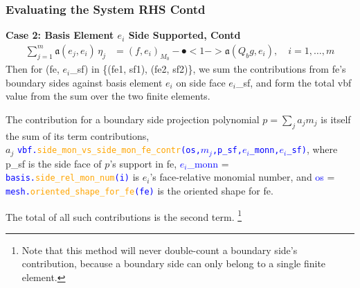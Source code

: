 \documentclass[compress]{beamer}
\begin{document}
\begin{frame}
  \frametitle{Evaluating the System RHS Contd}
  \textbf{Case 2: Basis Element $e_i$ Side Supported, Contd}
  \vspace{-.15cm}
  \begin{align*}
    \sum_{j=1}^m{\mathfrak{a}(e_j, e_i) \,\eta_j} &= (f, e_i)_{M_0} - \spot<1->{\mathfrak{a}(Q_b g, e_i)}, \quad i=1,\dots,m
  \end{align*}
  Then for (fe, $e_i$\_sf) in \{(fe1, sf1), (fe2, sf2)\},
  we sum the contributions from fe's boundary sides against basis element $e_i$ on side face $e_i$\_sf, and form the total
  vbf value from the sum over the two finite elements.
  
  The contribution for a boundary side projection polynomial $p=\sum_j a_j m_j$ is itself the sum of its term contributions,\\ 
  $a_j$ {\small \texttt{\textcolor{blue}{vbf.\textcolor{orange}{side\_mon\_vs\_side\_mon\_fe\_contr}(os,$m_j$,p\_sf,$e_i$\_monn,$e_i$\_sf)}}},
  where p\_sf is the side face of $p$'s support in fe, 
  \textcolor{blue}{\small $e_i$\_monn} = {\small \texttt{\textcolor{blue}{basis.\textcolor{orange}{side\_rel\_mon\_num}(i)}}} is
  $e_i$'s face-relative monomial number, and 
  \textcolor{blue}{\small os} = {\small \texttt{\textcolor{blue}{mesh.\textcolor{orange}{oriented\_shape\_for\_fe}(fe)}}} is the 
  oriented shape for fe.

  The total of all such contributions is the second term.
  \footnote{Note that this method will never double-count a boundary side's contribution, because a boundary side can only belong
   to a single finite element.}

\end{frame}
\end{document}
